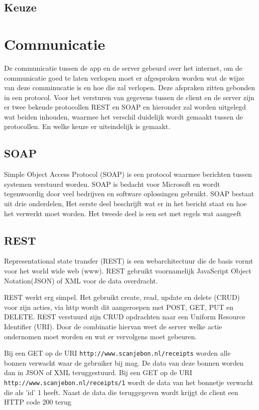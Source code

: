 \documentclass[a4paper,11pt,oneside]{report}
\begin{document}
\subsection{Keuze}

\section{Communicatie}
De communicatie tussen de app en de server gebeurd over het internet, om de communicatie goed te laten verlopen moet er afgesproken worden wat de wijze van deze comminucatie is en hoe die zal verlopen. Deze afspraken zitten gebonden in een protocol. Voor het versturen van gegevens tussen de client en de server zijn er twee bekende protocollen REST en SOAP en hieronder zal worden uitgelegd wat beiden inhouden, waarmee het verschil duidelijk wordt gemaakt tussen de protocollen. En welke keuze er uiteindelijk is gemaakt.

\subsection{SOAP}
Simple Object Access Protocol (SOAP) is een protocol waarmee berichten tussen systemen verstuurd worden. SOAP is bedacht voor Microsoft en wordt tegenwoordig door veel bedrijven en software oplossingen gebruikt. SOAP bestaat uit drie onderdelen, Het eerste deel beschrijft wat er in het bericht staat en hoe het verwerkt moet worden. Het tweede deel is een set met regels wat aangeeft 


\subsection{REST}
Representational state transfer (REST) is een webarchitectuur die de basis vormt voor het world wide web (www). REST gebruikt voornamelijk JavaScript Object Notation(JSON) of XML voor de data overdracht.

REST werkt erg simpel. Het gebruikt create, read, update en delete (CRUD) voor zijn acties, via http wordt dit aangeroepen met POST, GET, PUT en DELETE. REST verstuurd zijn CRUD opdrachten naar een Uniform Resource Identifier (URI). Door de combinatie hiervan weet de server welke actie ondernomen moet worden en wat er vervolgens moet gebeuren.
\newline

Bij een GET op de URI \colorbox{code-block}{\lstinline[style=code-block]|http://www.scanjebon.nl/receipts|} worden alle bonnen verwacht waar de gebruiker bij mag. De data van deze bonnen worden dan in JSON of XML teruggestuurd. Bij een GET op de URI \colorbox{code-block}{\lstinline[style=code-block]|http://www.scanjebon.nl/receipts/1|} wordt de data van het bonnetje verwacht die als 'id' 1 heeft. Naast de data die teruggegeven wordt krijgt de client een HTTP code 200 terug
\end{document}
